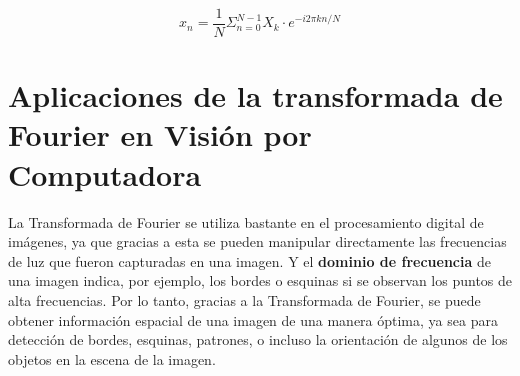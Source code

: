 \documentclass[a4paper, 12pt]{article}
\begin{document}
\begin{equation}
    x_n=\frac{1}{N}\Sigma_{n=0}^{N-1}X_k\cdot e^{-i2\pi kn/N}
\end{equation}

\section*{Aplicaciones de la transformada de Fourier en Visión por Computadora}
La Transformada de Fourier se utiliza bastante en el procesamiento digital de imágenes, ya que gracias a esta se pueden manipular directamente las frecuencias de luz que fueron capturadas en una imagen. Y el \textbf{dominio de frecuencia} de una imagen indica, por ejemplo, los bordes o esquinas si se observan los puntos de alta frecuencias. Por lo tanto, gracias a la Transformada de Fourier, se puede obtener información espacial de una imagen de una manera óptima, ya sea para detección de bordes, esquinas, patrones, o incluso la orientación de algunos de los objetos en la escena de la imagen.



\nocite{*}
\end{document}
